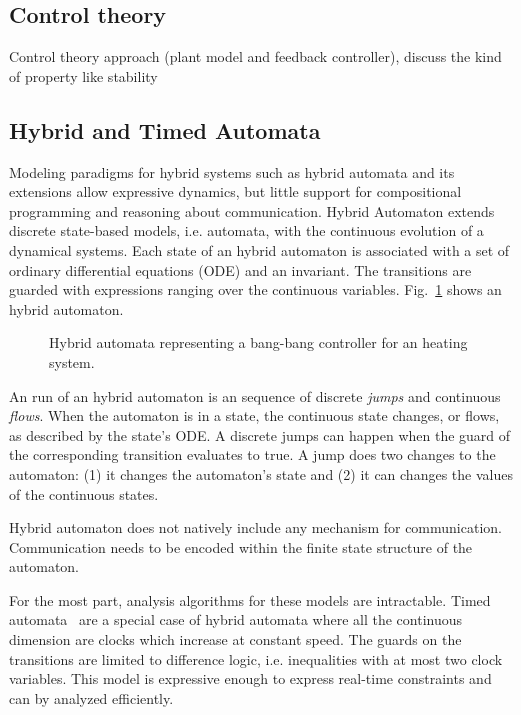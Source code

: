 \documentclass[
graybox,
envcountchap
]{svmult}
\begin{document}
\begin{bibunit}
    \subsection{Control theory}

Control theory approach (plant model and feedback controller), discuss the kind of property like stability

    \subsection{Hybrid and Timed Automata}

Modeling paradigms for hybrid systems such as hybrid automata and its extensions \cite{DBLP:conf/lics/Henzinger96,AlurGLS06,DBLP:journals/iandc/LynchSV03} allow expressive dynamics, but little support for compositional programming and reasoning about communication.
Hybrid Automaton extends discrete state-based models, i.e. automata, with the continuous evolution of a dynamical systems.
Each state of an hybrid automaton is associated with a set of ordinary differential equations (ODE) and an invariant.
The transitions are guarded with expressions ranging over the continuous variables.
Fig.~\ref{fig:HA-ex1} shows an hybrid automaton.

\begin{figure}
\centering

\caption{Hybrid automata representing a bang-bang controller for an heating system.}
\label{fig:HA-ex1}
\end{figure}

An run of an hybrid automaton is an sequence of discrete \emph{jumps} and continuous \emph{flows}.
When the automaton is in a state, the continuous state changes, or flows, as described by the state's ODE.
A discrete jumps can happen when the guard of the corresponding transition evaluates to true.
A jump does two changes to the automaton: (1) it changes the automaton's state and (2) it can changes the values of the continuous states.

Hybrid automaton does not natively include any mechanism for communication.
Communication needs to be encoded within the finite state structure of the automaton.

For the most part, analysis algorithms for these models are intractable.
Timed automata~\cite{DBLP:journals/tcs/AlurD94} are a special case of hybrid automata where all the continuous dimension are clocks which increase at constant speed.
The guards on the transitions are limited to difference logic, i.e. inequalities with at most two clock variables.
This model is expressive enough to express real-time constraints and can by analyzed efficiently. %


\end{bibunit}
\end{document}
